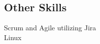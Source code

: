 \documentclass[letterpaper]{deedy-resume} %
\begin{document}
\begin{minipage}[t]{0.33\textwidth}
\vspace{5pt}
\subsection{Other Skills}

\textbullet{} Scrum and Agile utilizing Jira\\
\textbullet{} Linux \\

\sectionspace %


\end{minipage} %
\hfill
%
%
\end{document}

